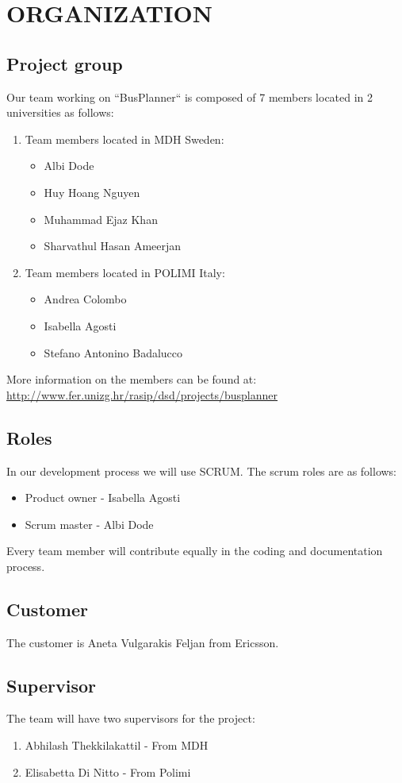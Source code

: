 \section{ORGANIZATION}
\subsection{Project group}
Our team working on “BusPlanner“ is composed of 7 members located in 2 universities as follows:
\begin{enumerate}
	\item Team members located in MDH Sweden:
	\begin{itemize}
		\item Albi Dode
		\item Huy Hoang Nguyen
		\item Muhammad Ejaz Khan
		\item Sharvathul Hasan Ameerjan	
	\end{itemize}
	\item Team members located in POLIMI Italy:
	\begin{itemize}
		\item Andrea Colombo
		\item Isabella Agosti
		\item Stefano Antonino Badalucco	
	\end{itemize}
\end{enumerate}
More information on the members can be found at: \\
\url{http://www.fer.unizg.hr/rasip/dsd/projects/busplanner}
\subsection{Roles}
In our development process we will use SCRUM. The scrum roles are as follows:
\begin{itemize}
	\item Product owner - Isabella Agosti
	\item Scrum master - Albi Dode
\end{itemize}
Every team member will contribute equally in the coding and documentation process.
\subsection{Customer}
The customer is Aneta Vulgarakis Feljan from Ericsson.
\subsection{Supervisor}
The team will have two supervisors for the project: 
\begin{enumerate}
	\item Abhilash Thekkilakattil - From MDH
	\item Elisabetta Di Nitto - From Polimi
\end{enumerate}
